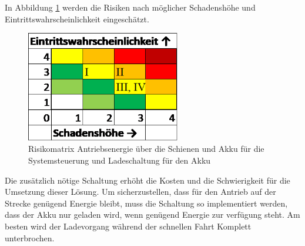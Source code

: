 \documentclass[../../main.tex]{subfiles}
\begin{document}
    In Abbildung \ref{fig:strom_risikomatrix_akku_mitladung} werden die Risiken nach möglicher Schadenshöhe und Eintrittswahrscheinlichkeit eingeschätzt.

    \begin{figure}[H]
        \centering
        \includegraphics[width=0.6\textwidth]{Strom_Risiko_Akku_Ladung.png}
        \caption {Risikomatrix Antriebsenergie über die Schienen und Akku für die Systemsteuerung und Ladeschaltung für den Akku}
        \label{fig:strom_risikomatrix_akku_mitladung}
    \end{figure}

    Die zusätzlich nötige Schaltung erhöht die Kosten und die Schwierigkeit für die Umsetzung dieser Lösung. Um sicherzustellen, dass für den Antrieb auf der Strecke genügend Energie bleibt, muss die Schaltung so implementiert werden, dass der Akku nur geladen wird, wenn genügend Energie zur verfügung steht. Am besten wird der Ladevorgang während der schnellen Fahrt Komplett unterbrochen.

    
\end{document}
